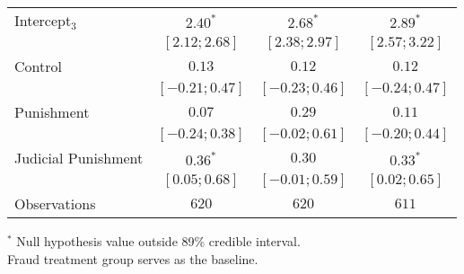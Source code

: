 \begin{table}[h]
\begin{center}
\begin{threeparttable}
\begin{tabular}{l c c c}
Intercept$_3$       & $2.40^{*}$        & $2.68^{*}$        & $2.89^{*}$        \\
                    & $ [ 2.12;  2.68]$ & $ [ 2.38;  2.97]$ & $ [ 2.57;  3.22]$ \\
Control             & $0.13$            & $0.12$            & $0.12$            \\
                    & $ [-0.21;  0.47]$ & $ [-0.23;  0.46]$ & $ [-0.24;  0.47]$ \\
Punishment          & $0.07$            & $0.29$            & $0.11$            \\
                    & $ [-0.24;  0.38]$ & $ [-0.02;  0.61]$ & $ [-0.20;  0.44]$ \\
Judicial Punishment & $0.36^{*}$        & $0.30$            & $0.33^{*}$        \\
                    & $ [ 0.05;  0.68]$ & $ [-0.01;  0.59]$ & $ [ 0.02;  0.65]$ \\
\hline
Observations        & $620$             & $620$             & $611$             \\
\hline
\end{tabular}
\begin{tablenotes}[flushleft]
\scriptsize{$^*$ Null hypothesis value outside 89\% credible interval.  \\
Fraud treatment group serves as the baseline.}
\end{tablenotes}
\end{threeparttable}
\label{table:ol_main_ru_npol_667}
\end{center}
\end{table}
